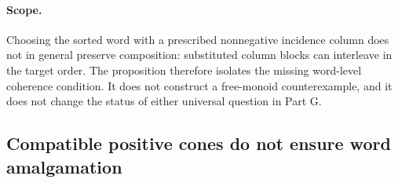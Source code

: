 \paragraph{Scope.}
Choosing the sorted word with a prescribed nonnegative
incidence column does not in general preserve composition:
substituted column blocks can interleave in the target order.
The proposition therefore isolates the missing word-level
coherence condition. It does not construct a free-monoid
counterexample, and it does not change the status of either
universal question in Part G.


\subsection{Compatible positive cones do not ensure word amalgamation}

